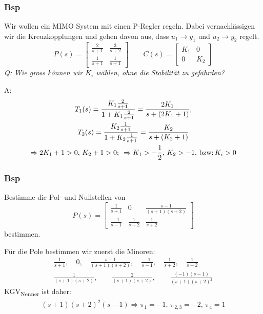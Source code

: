     \subsubsection{Bsp}
        Wir wollen ein MIMO System mit einen P-Regler regeln. Dabei vernachlässigen wir die Kreuzkopplungen und gehen davon aus, dass $u_1 \rightarrow y_1$ und $u_2 \rightarrow y_2$ regelt.
        \begin{equation*}
            P(s) =
            \begin{bmatrix}
            \frac{2}{s+1}  &    \frac{3}{s+2}\\
            \frac{1}{s+1}  &    \frac{1}{s+1}
            \end{bmatrix}
            \qquad
            C(s) = 
            \begin{bmatrix}
            K_1 & 0\\
            0   & K_2
            \end{bmatrix}
        \end{equation*}
        \textit{Q: Wie gross können wir $K_i$ wählen, ohne die Stabilität zu gefährden?}
        
        A: 
        \begin{gather*}
            T_1(s) = \frac{K_1\frac{2}{s+1}}{1 + K_1\frac{2}{s+1}} = \frac{2K_1}{s +(2K_1 + 1)},\\
            T_2(s) = \frac{K_2\frac{1}{s+1}}{1 + K_2\frac{1}{s+1}} = \frac{K_2}{s + (K_2 + 1)}\\
            \Rightarrow 2K_1 + 1 > 0, \, K_2 + 1 > 0;\ \, \Rightarrow K_1 > -\frac{1}{2},\, K_2 > -1,\, \textnormal{bzw:}\, K_i > 0
        \end{gather*}
        
    \subsubsection{Bsp}
        Bestimme die Pol- und Nullstellen von
        \begin{equation*}
            P(s) = 
            \begin{bmatrix}
            \frac{1}{s+1}   &   0   &   \frac{s-1}{(s+1)(s+2)}\\
            \frac{-1}{s-1}  &   \frac{1}{s+2} & \frac{1}{s+2}
            \end{bmatrix}
        \end{equation*}
        bestimmen.
        
        Für die Pole bestimmen wir zuerst die Minoren:
        \begin{gather*}
            \frac{1}{s+1},\quad 0,\quad \frac{s-1}{(s+1)(s+2)},\quad\frac{-1}{s-1},\quad \frac{1}{s+2},\quad \frac{1}{s+2}\\
            \frac{1}{(s+1)(s+2)},\qquad \frac{2}{(s+1)(s+2)},\qquad \frac{(-1)(s-1)}{(s+1)(s+2)^2}
        \end{gather*}
        KGV\textsubscript{Nenner} ist daher:
        \begin{gather*}
            (s+1)(s+2)^2(s-1) \Rightarrow \pi_1 = -1,\, \pi_{2,3} = -2,\, \pi_4 = 1
        \end{gather*}
        
